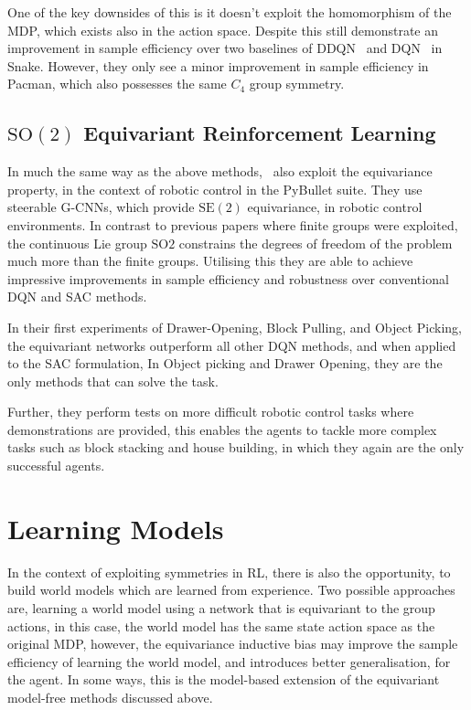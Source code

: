 One of the key downsides of this is it doesn't exploit the homomorphism of the MDP, which exists also in the action space. Despite this \cite{mondal2020group} still demonstrate an improvement in sample efficiency over two baselines of DDQN~\cite{van2016deep} and DQN~\cite{mnih2013playing} in Snake. However, they only see a minor improvement in sample efficiency in Pacman, which also possesses the same $C_4$ group symmetry.

\subsection{$\mathrm{SO}(2)$ Equivariant Reinforcement Learning}

In much the same way as the above methods,~\cite{wang2022so2} also exploit the equivariance property, in the context of robotic control in the PyBullet suite\cite{coumans2021}. They use steerable G-CNNs\cite{weiler2019general}, which provide $\text{SE}(2)$ equivariance, in robotic control environments. In contrast to previous papers where finite groups were exploited, the continuous Lie group $\text{SO}2$ constrains the degrees of freedom of the problem much more than the finite groups. Utilising this they are able to achieve impressive improvements in sample efficiency and robustness over conventional DQN and SAC methods.

In their first experiments of Drawer-Opening, Block Pulling, and Object Picking, the equivariant networks outperform all other DQN methods, and when applied to the SAC formulation, In Object picking and Drawer Opening, they are the only methods that can solve the task.

Further, they perform tests on more difficult robotic control tasks where demonstrations are provided, this enables the agents to tackle more complex tasks such as block stacking and house building, in which they again are the only successful agents.


\section{Learning Models}
In the context of exploiting symmetries in RL, there is also the opportunity, to build world models which are learned from experience. Two possible approaches are, learning a world model using a network that is equivariant to the group actions, in this case, the world model has the same state action space as the original MDP, however, the equivariance inductive bias may improve the sample efficiency of learning the world model, and introduces better generalisation, for the agent. In some ways, this is the model-based extension of the equivariant model-free methods discussed above.

